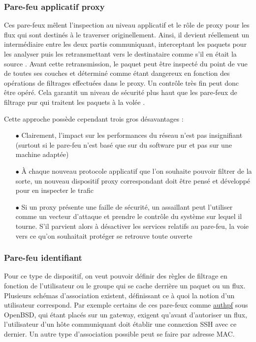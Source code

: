 \documentclass[]{article}
\begin{document}
\newpage

\subsubsection{Pare-feu applicatif proxy}

Ces pare-feux mêlent l'inspection au niveau applicatif et le rôle de proxy pour les flux qui sont destinés à le traverser originellement. Ainsi, il devient réellement un intermédiaire entre les deux partis communiquant, interceptant les paquets pour les analyser puis les retransmettant vers le destinataire comme s'il en était la source \cite{Shimonski2013}. Avant cette retransmission, le paquet peut être inspecté du point de vue de toutes ses couches et déterminé comme étant dangereux en fonction des opérations de filtrages effectuées dans le proxy. Un contrôle très fin peut donc être opéré. Cela garantit un niveau de sécurité plus haut que les pare-feux de filtrage pur qui traitent les paquets à la volée \cite{frameIP}.\\

\par Cette approche possède cependant trois gros désavantages : 
\begin{itemize}
\vspace{0.2cm}
\item[$\bullet$] Clairement, l'impact sur les performances du réseau n'est pas insignifiant (surtout si le pare-feu n'est basé que sur du software pur et pas sur une machine adaptée)
\vspace{0.2cm}
\item[$\bullet$] À chaque nouveau protocole applicatif que l'on souhaite pouvoir filtrer de la sorte, un nouveau dispositif proxy correspondant doit être pensé et développé pour en inspecter le trafic
\vspace{0.2cm}
\item[$\bullet$] Si un proxy présente une faille de sécurité, un assaillant peut l'utiliser comme un vecteur d'attaque et prendre le contrôle du système sur lequel il tourne. S'il parvient alors à désactiver les services relatifs au pare-feu, la voie vers ce qu'on souhaitait protéger se retrouve toute ouverte
\end{itemize}


\subsubsection{Pare-feu identifiant}\label{idfw}

Pour ce type de dispositif, on veut pouvoir définir des règles de filtrage en fonction de l'utilisateur ou le groupe qui se cache derrière un paquet ou un flux. Plusieurs schémas d'association existent, définissant ce à quoi la notion d'un utilisateur correspond. Par exemple certains de ces pare-feux comme \href{http://www.openbsd.org/faq/pf/authpf.html}{authpf} sous OpenBSD, qui étant placés sur un gateway, exigent qu'avant d'autoriser un flux, l'utilisateur d'un hôte communiquant doit établir une connexion SSH avec ce dernier. Un autre type d'association possible peut se faire par adresse MAC.\\
\end{document}
